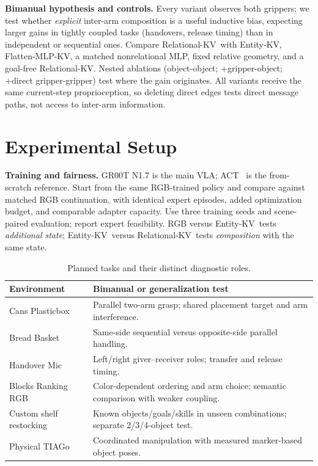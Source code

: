 \documentclass[letterpaper,10pt,conference]{ieeeconf}
\newcommand{\ekv}{Entity-KV}
\newcommand{\fkv}{Flatten-MLP-KV}
\newcommand{\rkv}{Relational-KV}
\begin{document}
\textbf{Bimanual hypothesis and controls.}
Every variant observes both grippers; we test whether \emph{explicit} inter-arm composition is a useful inductive bias, expecting larger gains in tightly coupled tasks (handovers, release timing) than in independent or sequential ones. Compare \rkv\ with \ekv, \fkv, a matched nonrelational MLP, fixed relative geometry, and a goal-free \rkv. Nested ablations (object-object; +gripper-object; +direct gripper-gripper) test where the gain originates. All variants receive the same current-step proprioception, so deleting direct edges tests direct message paths, not access to inter-arm information.

\section{Experimental Setup}
\label{sec:setup}

\textbf{Training and fairness.}
GR00T N1.7 is the main VLA; ACT~\cite{zhao2023act} is the from-scratch reference. Start from the same RGB-trained policy and compare against matched RGB continuation, with identical expert episodes, added optimization budget, and comparable adapter capacity. Use three training seeds and scene-paired evaluation; report expert feasibility. RGB versus \ekv\ tests \emph{additional state}; \ekv\ versus \rkv\ tests \emph{composition} with the same state.

\begin{table}[!t]
\caption{Planned tasks and their distinct diagnostic roles.}
\label{tab:tasks}
\centering\footnotesize
\begin{tabularx}{\columnwidth}{@{}p{}X@{}}
\toprule
\textbf{Environment} & \textbf{Bimanual or generalization test}\\
\midrule
Cans Plasticbox &
Parallel two-arm grasp; shared placement target and arm interference.\\
Bread Basket &
Same-side sequential versus opposite-side parallel handling.\\
Handover Mic &
Left/right giver--receiver roles; transfer and release timing.\\
Blocks Ranking RGB &
Color-dependent ordering and arm choice; semantic comparison with weaker coupling.\\
Custom shelf restocking &
Known objects/goals/skills in unseen combinations; separate 2/3/4-object test.\\
Physical TIAGo &
Coordinated manipulation with measured marker-based object poses.\\
\bottomrule
\end{tabularx}
\end{table}
\end{document}
